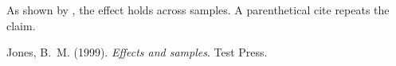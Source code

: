 \documentclass{article}
\begin{document}
As shown by , the effect holds across samples.
A parenthetical cite \cite{Jones1999} repeats the claim.

\begin{thebibliography}{}
Jones, B.~M. (1999). \textit{Effects and samples}. Test Press.
\end{thebibliography}
\end{document}
